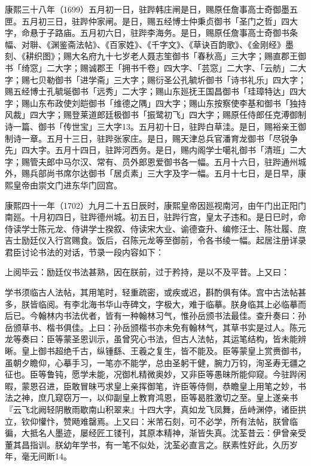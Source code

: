 康熙三十八年（1699）五月初一日，驻跸韩庄闸是日，赐原任詹事高士奇御墨五匣。五月初三日，驻跸仲家闸。是日，赐五经博士仲秉贞御书「圣门之哲」四大字，命悬于子路庙。五月初六日，驻跸李海务。是日，赐原任詹事高士奇御书条幅、对聨、《渊鉴斋法帖》、《百家姓》、《千字文》、《草诀百韵歌》、《金刚经》墨刻、《耕织图》；赐大名府九十七岁老人聂志笙御书「春秋高」三大字；赐直郡王御书「绮窓」二大字；赐诚郡王「拥书千卷」四大字、「芸窓」二大字、「云舫」二大字；赐七贝勒御书「进学斋」三大字；赐衍圣公孔毓圻御书「诗书礼乐」四大字；赐五经博士孔毓埏御书「远秀」二大字；赐山东廵抚王国昌御书「珪璋特达」四大字；赐山东布政使刘皑御书「维德之隅」四大字；赐山东按察使李基和御书「独持风裁」四大字；赐登莱道郎廷极御书「振鹭初飞」四大字；赐原任侍郎任克溥御制诗一篇、御书「传世宝」三大字13。五月初十日，驻跸白草洼。是日，赐裕亲王御制诗一章。五月十三日，驻跸张家庄。是日，赐天津总兵官潘育龙御书「尽锐争先」四大字。五月十四日，驻跸河西务。是日，赐内阁学士噶礼御书「清班」二大字；赐管夫郎中马尔汉、常有、员外郎恩爱御书各一幅。五月十六日，驻跸通州城外，赐兵部尚书席尔达御书「居贞素」三大字及字一幅。五月十七日，是日早，康熙皇帝由崇文门进东华门回宫。

康熙四十一年（1702）九月二十五日辰时，康熙皇帝因廵视南河，由午门出正阳门南廵。十月初四日，驻跸德州城。初五日，驻跸行宫，皇太子违和。是日巳时，命侍读学士陈元龙、侍讲学士揆叙、侍读宋大业、谕德查升、编修汪士、陈壮履、庶吉士励廷仪入行宫赐食。饭后，召陈元龙等至御前，令各书绫一幅。起居注册详录君臣讨论书法的对话，节录一段内容如下：

\begin{BookQuote}
上阅毕云：励廷仪书法甚熟，因在朕前，过于矜持，是以不及平昔。上又曰：
\end{BookQuote}

\vfill
\begin{BookNotes}
\end{BookNotes}

\begin{BookQuote}
学书须临古人法帖，其用笔时，轻重疏密，或疾或迟，斟酌俱有体。宫中古法帖甚多，朕皆临阅。有李北海书华山寺碑文，字极大，难于临摹。朕身临其上必临摹而后已。今翰林内书法优者，皆有一种翰林习气，惟孙岳颁书法最佳。查升奏曰：孙岳颁草书、楷书俱佳。上曰：孙岳颁楷书亦未免有翰林气，其草书实是过人。陈元龙等奏曰：臣等蒙圣恩训示，虽曾究心书法，但古人法帖，其运笔结构，皆未能辨晰。皇上御书超绝千古，纵锺繇、王羲之复生，皆不能及。臣等蒙皇上赏赉御书，虽朝夕瞻仰，心摹手习，一笔亦不能学，总由圣躬干健，腕力万钧，洵圣寿无疆之征也。臣等鲁钝，愿学未能，况御札精微奥妙，又非臣等愚昧所能仰窥。今驻跸闲暇，蒙恩召进，臣敢冒昧丐求皇上亲挥御笔，许臣等侍侧，恭瞻皇上用笔之妙，书法之神，庶几窥窃万一，以仰副皇上教育鸿恩，臣等曷胜激切之至。皇上遂亲书『云飞北阙轻阴散雨歇南山积翠来』十四大字，真如龙飞凤舞，岳峙渊停，诸臣拱立，钦仰懽忭，赞飏难罄焉。上又曰：米芾石刻，可不必学，所有法帖，朕曾临徧，大抵名人墨迹，屡经匠工镂刊，其原本精神，渐皆失真。沈荃昔云：伊曾亲受董其昌指训。朕幼年学书，有一笔不似处，沈荃必直言之。朕素性好此，久历岁年，毫无间断14。
\end{BookQuote}


